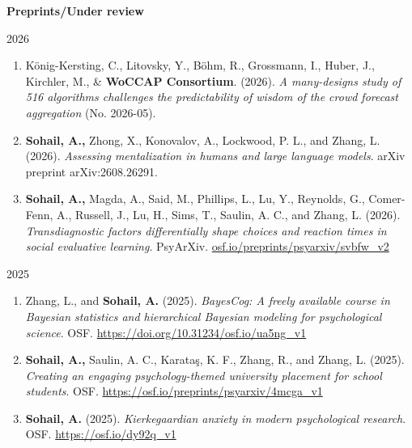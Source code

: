\vspace{0.5em}
\textbf{Preprints/Under review}
\vspace{1em}

{2026}
\begin{enumerate}[]

\item K\"onig-Kersting, C., Litovsky, Y., B\"ohm, R., Grossmann, I., Huber, J., Kirchler, M., \& \textbf{WoCCAP Consortium}. (2026). \textit{A many-designs study of 516 algorithms challenges the predictability of wisdom of the crowd forecast aggregation} (No. 2026-05).

\item \textbf{Sohail, A.,} Zhong, X., Konovalov, A., Lockwood, P. L., and Zhang, L. (2026). \textit{Assessing mentalization in humans and large language models}. arXiv preprint arXiv:2608.26291.

\item \textbf{Sohail, A.,} Magda, A., Said, M., Phillips, L., Lu, Y., Reynolds, G., Comer-Fenn, A., Russell, J., Lu, H., Sims, T., Saulin, A. C., and Zhang, L. (2026). \textit{Transdiagnostic factors differentially shape choices and reaction times in social evaluative learning}. PsyArXiv. \href{https://osf.io/preprints/psyarxiv/svbfw_v2}{osf.io/preprints/psyarxiv/svbfw\_v2}

\end{enumerate}

\vspace{0.5em}

{2025}
\begin{enumerate}[]

\item Zhang, L., and \textbf{Sohail, A.} (2025). \textit{BayesCog: A freely available course in Bayesian statistics and hierarchical Bayesian modeling for psychological science}. OSF. \href{https://doi.org/10.31234/osf.io/ua5ng\_v1}{https://doi.org/10.31234/osf.io/ua5ng\_v1}

\item \textbf{Sohail, A.,} Saulin, A. C., Karataş, K. F., Zhang, R., and Zhang, L. (2025). \textit{Creating an engaging psychology-themed university placement for school students}. OSF. \href{https://osf.io/preprints/psyarxiv/4mcga_v1}{https://osf.io/preprints/psyarxiv/4mcga\_v1}

\item \textbf{Sohail, A.} (2025). \textit{Kierkegaardian anxiety in modern psychological research}. OSF. \href{https://doi.org/10.31234/osf.io/dy92q_v1}{https://osf.io/dy92q\_v1}

\end{enumerate}